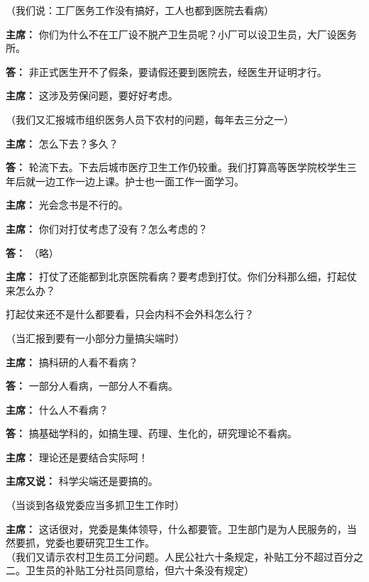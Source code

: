 \begin{duihua}
（我们说：工厂医务工作没有搞好，工人也都到医院去看病）

\item[\textbf{主席：}] 你们为什么不在工厂设不脱产卫生员呢？小厂可以设卫生员，大厂设医务所。

\item[\textbf{答：}] 非正式医生开不了假条，要请假还要到医院去，经医生开证明才行。

\item[\textbf{主席：}] 这涉及劳保问题，要好好考虑。

（我们又汇报城市组织医务人员下农村的问题，每年去三分之一）

\item[\textbf{主席：}] 怎么下去？多久？

\item[\textbf{答：}] 轮流下去。下去后城市医疗卫生工作仍较重。我们打算高等医学院校学生三年后就一边工作一边上课。护士也一面工作一面学习。

\item[\textbf{主席：}] 光会念书是不行的。

\item[\textbf{主席：}] 你们对打仗考虑了没有？怎么考虑的？

\item[\textbf{答：}] （略）

\item[\textbf{主席：}] 打仗了还能都到北京医院看病？要考虑到打仗。你们分科那么细，打起仗来怎么办？

打起仗来还不是什么都要看，只会内科不会外科怎么行？

（当汇报到要有一小部分力量搞尖端时）

\item[\textbf{主席：}] 搞科研的人看不看病？

\item[\textbf{答：}] 一部分人看病，一部分人不看病。

\item[\textbf{主席：}] 什么人不看病？

\item[\textbf{答：}] 搞基础学科的，如搞生理、药理、生化的，研究理论不看病。

\item[\textbf{主席：}] 理论还是要结合实际呵！

\item[\textbf{主席又说：}] 科学尖端还是要搞的。

（当谈到各级党委应当多抓卫生工作时）

\item[\textbf{主席：}] 这话很对，党委是集体领导，什么都要管。卫生部门是为人民服务的，当然要抓，党委也要研究卫生工作。\\
（我们又请示农村卫生员工分问题。人民公社六十条规定，补贴工分不超过百分之二。卫生员的补贴工分社员同意给，但六十条没有规定）


\end{duihua}
